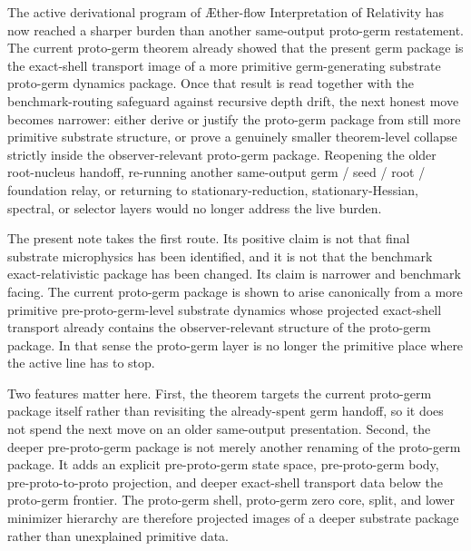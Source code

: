 \documentclass[11pt]{article}
\newcommand{\Aflow}{\AE{}ther-flow}
\newcommand{\TheoryName}{\Aflow{} Interpretation of Relativity}
\begin{document}
The active derivational program of \TheoryName{} has now reached a sharper burden than another same-output proto-germ restatement. The current proto-germ theorem already showed that the present germ package is the exact-shell transport image of a more primitive germ-generating substrate proto-germ dynamics package. Once that result is read together with the benchmark-routing safeguard against recursive depth drift, the next honest move becomes narrower: either derive or justify the proto-germ package from still more primitive substrate structure, or prove a genuinely smaller theorem-level collapse strictly inside the observer-relevant proto-germ package. Reopening the older root-nucleus handoff, re-running another same-output germ / seed / root / foundation relay, or returning to stationary-reduction, stationary-Hessian, spectral, or selector layers would no longer address the live burden.

The present note takes the first route. Its positive claim is not that final substrate microphysics has been identified, and it is not that the benchmark exact-relativistic package has been changed. Its claim is narrower and benchmark facing. The current proto-germ package is shown to arise canonically from a more primitive pre-proto-germ-level substrate dynamics whose projected exact-shell transport already contains the observer-relevant structure of the proto-germ package. In that sense the proto-germ layer is no longer the primitive place where the active line has to stop.

Two features matter here. First, the theorem targets the current proto-germ package itself rather than revisiting the already-spent germ handoff, so it does not spend the next move on an older same-output presentation. Second, the deeper pre-proto-germ package is not merely another renaming of the proto-germ package. It adds an explicit pre-proto-germ state space, pre-proto-germ body, pre-proto-to-proto projection, and deeper exact-shell transport data below the proto-germ frontier. The proto-germ shell, proto-germ zero core, split, and lower minimizer hierarchy are therefore projected images of a deeper substrate package rather than unexplained primitive data.
\end{document}
